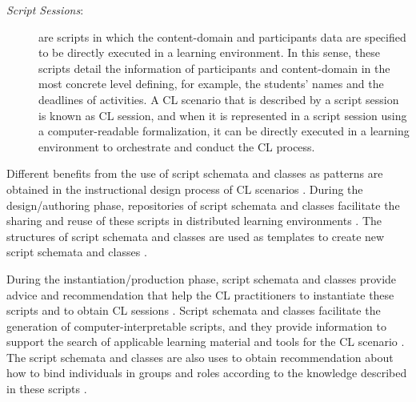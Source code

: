 \begin{description}
\item[\emph{Script Sessions}:] are scripts in which the content-domain and participants data are specified to be directly executed in a learning environment.
In this sense, these scripts detail the information of participants and content-domain in the most concrete level defining, for example, the students' names and the deadlines of activities.
A CL scenario that is described by a script session is known as CL session, and when it is represented in a script session using a computer-readable formalization, it can be directly executed in a learning environment to orchestrate and conduct the CL process.
\end{description}

Different benefits from the use of script schemata and classes as patterns are obtained in the instructional design process of CL scenarios \cite{AlharbiAthaudaChiong2014, ChallcoBittencourtIsotani2016, MiaoHoeksemaHoppeHarrer2005}. During the design/authoring phase, repositories of script schemata and classes facilitate the sharing and reuse of these scripts in distributed learning environments \cite{PrietoAsensio-PerezMunoz-CristobalDimitriadisJorrin-AbellanGomez-Sanchez2013, PrietoTchounikineAsensio-PerezSobreiraDimitriadis2014}.
The structures of script schemata and classes are used as templates to create new script schemata and classes \cite{AndreasHarrerUlrchHoppe2007, RonenKohen-Vacs2009}. 

During the instantiation/production phase, script schemata and classes provide advice and recommendation that help the CL practitioners to instantiate these scripts and to obtain CL sessions \cite{MagnisalisDemetriadis2012a, PrietoAsensio-PerezDimitriadisGomez-SanchezMunoz-Cristobal2011,Alario-HoyosBote-LorenzoGomez-SanchezAsensio-PerezVega-GorgojoRuiz-Calleja2013}.
Script schemata and classes facilitate the generation of computer-interpretable scripts, and they provide information to support the search of applicable learning material and tools for the CL scenario \cite{Bote-LorenzoVaquero-GonzalezVega-GorgojoDimitriadisAsensio-PerezGomez-SanchezHernandez-Leo2004, IsotaniMizoguchi2008a, Vega-GorgojoBote-LorenzoGomez-SanchezDimitriadisAsensio-Perez2005}.
The script schemata and classes are also uses to obtain recommendation about how to bind individuals in groups and roles according to the knowledge described in these scripts \cite{IsotaniMizoguchiIsotaniCapeliIsotanideAlbuquerqueBittencourtJaques2013,Villasclaras-FernandezHernandez-GonzaloLeoAsensio-PerezDimitriadisMartinez-Mones2009}.

